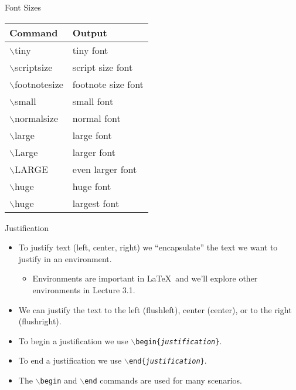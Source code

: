 \documentclass[pdf]{prosper}
\begin{document}
\begin{slide}{Font Sizes}
		\begin{center}
				\begin{tabular}{l l}
					\hline
					Command & Output \\
					\hline
					$\backslash$tiny & \tiny tiny font \\
					$\backslash$scriptsize & \scriptsize script size font \\
					$\backslash$footnotesize & \footnotesize footnote size font \\
					$\backslash$small & \small small font \\
					$\backslash$normalsize & \normalsize normal font \\
					$\backslash$large & \large large font \\
					$\backslash$Large & \large larger font \\
					$\backslash$LARGE & \LARGE even larger font \\
					$\backslash$huge & \huge huge font \\
					$\backslash$huge & \Huge largest font \\
				\end{tabular}
			\end{center}
\end{slide}
\begin{slide}{Justification}
	\begin{itemize}
		\item To justify text (left, center, right) we ``encapsulate'' the text we want to justify in an environment.
			\begin{itemize}
				\item Environments are important in \LaTeX\ and we'll explore other environments in Lecture 3.1.
			\end{itemize}
		\item We can justify the text to the left (flushleft), center (center), or to the right (flushright).
		\item To begin a justification we use \texttt{$\backslash$begin\{\textit{justification}\}}.
		\item To end a justification we use \texttt{$\backslash$end\{\textit{justification}\}}.
		\item The \texttt{$\backslash$begin} and \texttt{$\backslash$end} commands are used for many scenarios.
	\end{itemize}
\end{slide}
\end{document}
